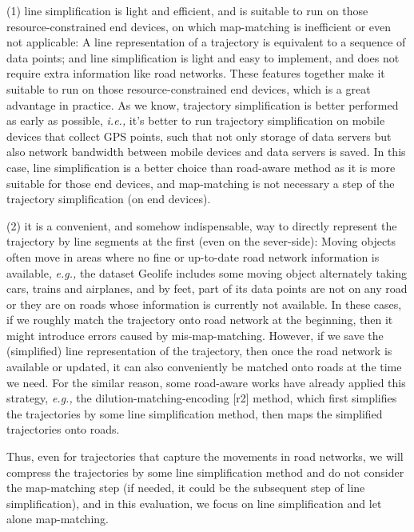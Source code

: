 \documentclass{letter}
\newcommand{\ie}{\emph{i.e.,}\xspace}
\newcommand{\eg}{\emph{e.g.,}\xspace}
\begin{document}
(1) line simplification is light and efficient, and is suitable to run on those resource-constrained end devices, on which map-matching is inefficient or even not applicable: A line representation of a trajectory is equivalent to a sequence of data points; and line simplification is light and easy to implement, and does not require extra information like road networks. These features together make it suitable to run on those resource-constrained end devices, which is a great advantage in practice. As we know, trajectory simplification is better performed as early as possible, \ie it's better to run trajectory simplification on mobile devices that collect GPS points, such that not only storage of data servers but also network bandwidth between mobile devices and data servers is saved. In this case, line simplification is a better choice than road-aware method as it is more suitable for those end devices, and map-matching is not necessary a step of the trajectory simplification (on end devices).

(2) it is a convenient, and somehow indispensable, way to directly represent the trajectory by line segments at the first (even on the sever-side): Moving objects often move in areas where no fine or up-to-date road network information is available, \eg the dataset Geolife includes some moving object alternately taking cars, trains and airplanes, and by feet, part of its data points are not on any road or they are on roads whose information is currently not available. In these cases, if we roughly match the trajectory onto road network at the beginning, then it might introduce errors caused by mis-map-matching. However, if we save the (simplified) line representation of the trajectory, then once the road network is available or updated, it can also conveniently be matched onto roads at the time we need. For the similar reason, some road-aware works have already applied this strategy, \eg the dilution-matching-encoding [r2] method, which first simplifies the trajectories by some line simplification method, then maps the simplified trajectories onto roads. 

Thus, even for trajectories that capture the movements in road networks, we will compress the trajectories by some line simplification method and do not consider the map-matching step (if needed, it could be the subsequent step of line simplification), and in this evaluation, we focus on line simplification and let alone map-matching.
 
\end{document}
